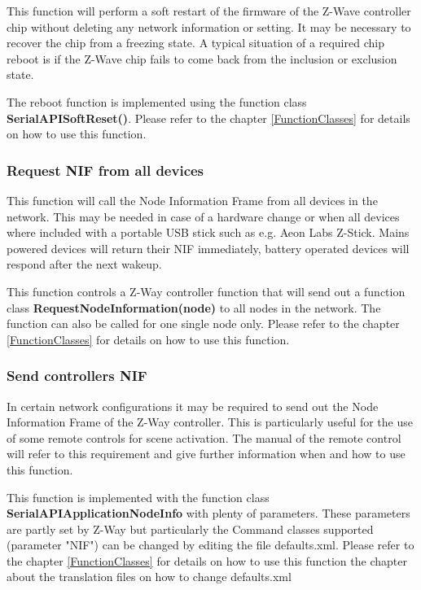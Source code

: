This function will perform a soft restart of the firmware of the Z-Wave controller chip without deleting any network information or setting. It may be necessary to recover the chip from a freezing state. A typical situation of a required chip reboot is if the Z-Wave chip fails to come back from the inclusion or exclusion state.

The reboot function is implemented using the function class {\bf SerialAPISoftReset()}.  Please refer to the chapter \ref{FunctionClasses} for details on how to use this function.


\subsubsection{Request NIF from all devices}

This function will call the Node Information Frame from all devices in the network. This may be needed in case of a hardware change or when all devices 
where included with a portable USB stick such as e.g. Aeon Labs Z-Stick.  Mains powered devices will return their NIF immediately, battery 
operated devices will respond after the next wakeup.


This function controls a Z-Way controller function that will send out a function class {\bf RequestNodeInformation(node)} to all nodes in the network. 
The function can also be called for one single node only. Please refer to the chapter \ref{FunctionClasses} for details on how to use this function.

\subsubsection{Send controllers NIF}

In certain network configurations it may be required to send out the Node Information Frame of the Z-Way controller. This is particularly useful 
for the use of some remote controls for scene activation. The manual of the remote control will refer to this requirement and give further 
information when and how to use this function.

This function is implemented with the function class {\bf SerialAPIApplicationNodeInfo} with plenty of parameters. These parameters are partly 
set by Z-Way but particularly the Command classes supported (parameter "NIF") can be changed by editing the file defaults.xml. Please refer to 
the chapter \ref{FunctionClasses} for details on how to use this function the chapter about the translation files on how to change defaults.xml

